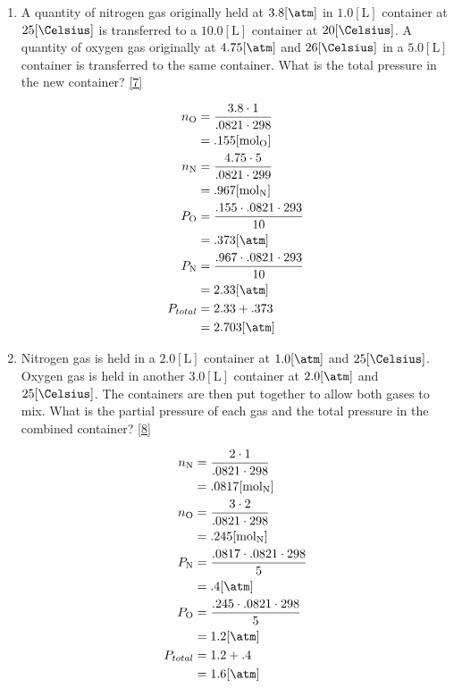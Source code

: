 \documentclass[12pt]{article}
\begin{document}
\begin{enumerate}
  \item A quantity of nitrogen gas originally held at $3.8[\si{\atm}]$ in $1.0[\si{\liter}]$ container at $25[\si{\Celsius}]$ is transferred to a $10.0[\si{\liter}]$ container at $20[\si{\Celsius}]$.  A quantity of oxygen gas originally at $4.75[\si{\atm}]$ and $26[\si{\Celsius}]$ in a $5.0[\si{\liter}]$ container is transferred to the same container.  What is the total pressure in the new container? \eqref{7}

    \begin{equation}
      \begin{split}
        n_{\ce{O}}&=\frac{3.8\cdot1}{.0821\cdot298}\\
        &=.155[\si{\mole}_{\ce{O}}]\\
        n_{\ce{N}}&=\frac{4.75\cdot5}{.0821\cdot299}\\
        &=.967[\si{\mole}_{\ce{N}}]\\
        P_{\ce{O}}&=\frac{.155\cdot.0821\cdot293}{10}\\
        &=.373[\si{\atm}]\\
        P_{\ce{N}}&=\frac{.967\cdot.0821\cdot293}{10}\\
        &=2.33[\si{\atm}]\\
        P_{total}&=2.33+.373\\
        &=2.703[\si{\atm}]
      \end{split}
      \label{7}
    \end{equation}

  \item Nitrogen gas is held in a $2.0[\si{\liter}]$ container at $1.0[\si{\atm}]$ and $25[\si{\Celsius}]$.  Oxygen gas is held in another $3.0[\si{\liter}]$ container at $2.0[\si{\atm}]$ and $25[\si{\Celsius}]$.  The containers are then put together to allow both gases to mix.  What is the partial pressure of each gas and the total pressure in the combined container? \eqref{8}

    \begin{equation}
      \begin{split}
        n_{\ce{N}}&=\frac{2\cdot1}{.0821\cdot298}\\
        &=.0817[\si{\mole}_{\ce{N}}]\\
        n_{\ce{O}}&=\frac{3\cdot2}{.0821\cdot298}\\
        &=.245[\si{\mole}_{\ce{N}}]\\
        P_{\ce{N}}&=\frac{.0817\cdot.0821\cdot298}{5}\\
        &=.4[\si{\atm}]\\
        P_{\ce{O}}&=\frac{.245\cdot.0821\cdot298}{5}\\
        &=1.2[\si{\atm}]\\
        P_{total}&=1.2+.4\\
        &=1.6[\si{\atm}]
      \end{split}
      \label{8}
    \end{equation}

\end{enumerate}
\end{document}
